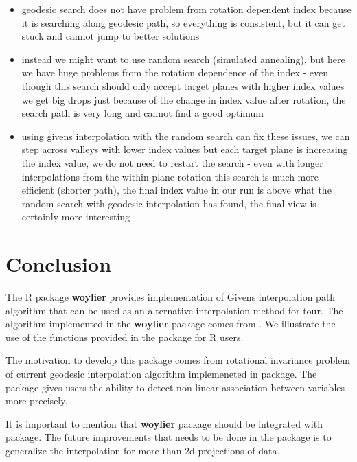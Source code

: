 \begin{itemize}
\tightlist
\item
  geodesic search does not have problem from rotation dependent index
  because it is searching along geodesic path, so everything is
  consistent, but it can get stuck and cannot jump to better solutions
\item
  instead we might want to use random search (simulated annealing), but
  here we have huge problems from the rotation dependence of the index -
  even though this search should only accept target planes with higher
  index values we get big drops just because of the change in index
  value after rotation, the search path is very long and cannot find a
  good optimum
\item
  using givens interpolation with the random search can fix these
  issues, we can step across valleys with lower index values but each
  target plane is increasing the index value, we do not need to restart
  the search - even with longer interpolations from the within-plane
  rotation this search is much more efficient (shorter path), the final
  index value in our run is above what the random search with geodesic
  interpolation has found, the final view is certainly more interesting
\end{itemize}

\hypertarget{conclusion}{%
\section{Conclusion}\label{conclusion}}

The R package \textbf{woylier} provides implementation of Givens
interpolation path algorithm that can be used as an alternative
interpolation method for tour. The algorithm implemented in the
\textbf{woylier} package comes from
\citet{buja_cook_asimov_hurley_2005}. We illustrate the use of the
functions provided in the package for R users.

The motivation to develop this package comes from rotational invariance
problem of current geodesic interpolation algorithm implemeneted in
 package. The package gives users the ability to detect
non-linear association between variables more precisely.

It is important to mention that \textbf{woylier} package should be
integrated with  package. The future improvements that
needs to be done in the package is to generalize the interpolation for
more than 2d projections of data.

